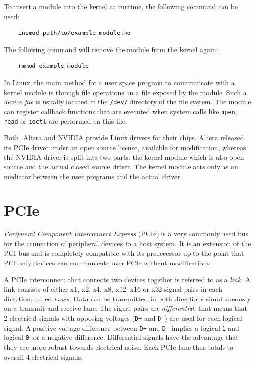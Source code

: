 To insert a module into the kernel at runtime, the following command can be used:
\begin{lstlisting}
	insmod path/to/example_module.ko
\end{lstlisting}

The following command will remove the module from the kernel again:
\begin{lstlisting}
	rmmod example_module
\end{lstlisting}

In Linux, the main method for a user space program to communicate with a kernel module is through file operations on a file exposed by the module.
Such a \emph{device file} is usually located in the \texttt{/dev/} directory of the file system.
The module can register callback functions that are executed when system calls like \texttt{open}, \texttt{read} or \texttt{ioctl} are performed on this file.



Both, Altera and NVIDIA provide Linux drivers for their chips.
Altera released its PCIe driver under an open source license, available for modification, whereas the NVIDIA driver is split into two parts: the kernel module which is also open source and the actual closed source driver. The kernel module acts only as an mediator between the user programs and the actual driver.


\section{PCIe}
\label{pcie}

\emph{Peripheral Component Interconnect Express} (PCIe) is a very commonly used bus for the connection of peripheral devices to a host system.
It is an extension of the PCI bus and is completely compatible with its predecessor up to the point that PCI-only devices can communicate over PCIe without modifications \cite{pcie}.

A PCIe interconnect that connects two devices together is referred to as a \emph{link}.
A link consists of either x1, x2, x4, x8, x12, x16 or x32 signal pairs in each direction, called \emph{lanes}. Data can be transmitted in both directions simultaneously on a transmit and receive lane.
The signal pairs are \emph{differential}, that means that 2 electrical signals with opposing voltages (\texttt{D+} and \texttt{D-}) are used for each logical signal.
A positive voltage difference between \texttt{D+} and \texttt{D-} implies a logical \texttt{1} and logical \texttt{0} for a negative difference.
Differential signals have the advantage that they are more robust towards electrical noise.
Each PCIe lane thus totals to overall 4 electrical signals. \cite{pcie}

